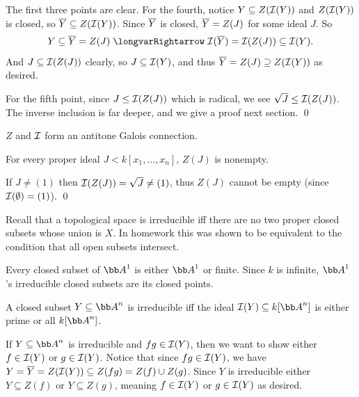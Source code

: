 \eprop

\bproof

    The first three points are clear.
    For the fourth, notice $Y\subseteq Z({{\cal I}}(Y))$ and $Z({{\cal I}}(Y))$ is closed, so ${\overline{Y}}\subseteq Z({{\cal I}}(Y))$.
    Since ${\overline{Y}}$ is closed, ${\overline{Y}}=Z(J)$ for some ideal $J$.
    So
    $$ Y \subseteq \cl Y = Z(J) \implies \I(\cl Y) = \I(Z(J)) \subseteq \I(Y) . $$
    And $J\subseteq{{\cal I}}(Z(J))$ clearly, so $J\subseteq{{\cal I}}(Y)$, and thus ${\overline{Y}}=Z(J)\supseteq Z({{\cal I}}(Y))$ as desired.

    For the fifth point, since $J\leq{{\cal I}}(Z(J))$ which is radical, we see $\sqrt J\leq{{\cal I}}(Z(J))$.
    The inverse inclusion is far deeper, and we give a proof next section.
    \qed

\eproof

\bcoro

    $Z$ and ${{\cal I}}$ form an antitone Galois connection.

\ecoro

\bcoro

    For every proper ideal $J<k[x_1,\dots,x_n]$, $Z(J)$ is nonempty.

\ecoro

\bproof

    If $J\neq(1)$ then ${{\cal I}}(Z(J))=\sqrt J\neq(1)$, thus $Z(J)$ cannot be empty (since ${{\cal I}}(\emptyset)=(1)$).
    \qed

\eproof

\bnote

    Recall that a topological space is irreducible iff there are no two proper closed subsets whose union is $X$.
    In homework this was shown to be equivalent to the condition that all open subsets intersect.

\enote

\bexam

    Every closed subset of $\bA^1$ is either $\bA^1$ or finite.
    Since $k$ is infinite, $\bA^1$'s irreducible closed subsets are its closed points.

\eexam

\bcoro

    A closed subset $Y\subseteq\bA^n$ is irreducible iff the ideal $\I(Y)\subseteq k[\bA^n]$ is either prime or all $k[\bA^n]$.

\ecoro

\bproof

    If $Y\subseteq\bA^n$ is irreducible and $fg\in{{\cal I}}(Y)$, then we want to show either $f\in{{\cal I}}(Y)$ or $g\in{{\cal I}}(Y)$.
    Notice that since $fg\in{{\cal I}}(Y)$, we have $Y={\overline{Y}}=Z({{\cal I}}(Y))\subseteq Z(fg)=Z(f)\cup Z(g)$.
    Since $Y$ is irreducible either $Y\subseteq Z(f)$ or $Y\subseteq Z(g)$, meaning $f\in{{\cal I}}(Y)$ or $g\in{{\cal I}}(Y)$ as desired.

